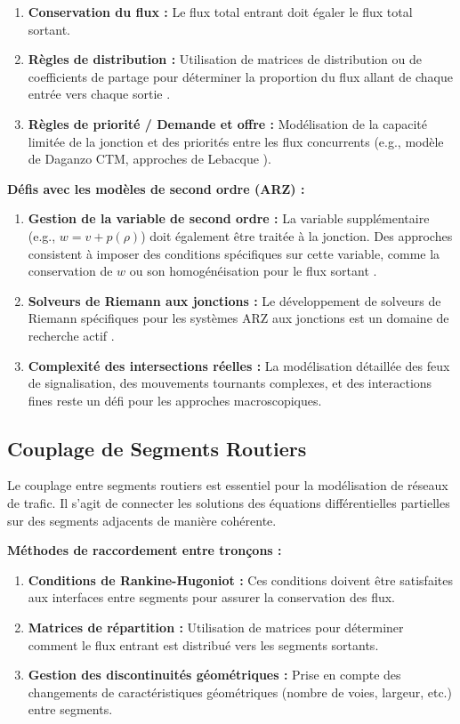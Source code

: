 \begin{enumerate}
    \item \textbf{Conservation du flux :} Le flux total entrant doit égaler le flux total sortant.
    \item \textbf{Règles de distribution :} Utilisation de matrices de distribution ou de coefficients de partage pour déterminer la proportion du flux allant de chaque entrée vers chaque sortie \cite{kolb2018pareto}.
    \item \textbf{Règles de priorité / Demande et offre :} Modélisation de la capacité limitée de la jonction et des priorités entre les flux concurrents (e.g., modèle de Daganzo CTM, approches de Lebacque \cite{Lebacque1996}).
\end{enumerate}

\textbf{Défis avec les modèles de second ordre (ARZ) :}

\begin{enumerate}
    \item \textbf{Gestion de la variable de second ordre :} La variable supplémentaire (e.g., $w = v + p(\rho)$) doit également être traitée à la jonction. Des approches consistent à imposer des conditions spécifiques sur cette variable, comme la conservation de $w$ ou son homogénéisation pour le flux sortant \cite{kolb2018pareto, HertyEtAl2007}.
    \item \textbf{Solveurs de Riemann aux jonctions :} Le développement de solveurs de Riemann spécifiques pour les systèmes ARZ aux jonctions est un domaine de recherche actif \cite{CostesequeSlides}.
    \item \textbf{Complexité des intersections réelles :} La modélisation détaillée des feux de signalisation, des mouvements tournants complexes, et des interactions fines reste un défi pour les approches macroscopiques.
\end{enumerate}

\subsection{Couplage de Segments Routiers}
Le couplage entre segments routiers est essentiel pour la modélisation de réseaux de trafic. Il s'agit de connecter les solutions des équations différentielles partielles sur des segments adjacents de manière cohérente.

\textbf{Méthodes de raccordement entre tronçons :}

\begin{enumerate}
    \item \textbf{Conditions de Rankine-Hugoniot :} Ces conditions doivent être satisfaites aux interfaces entre segments pour assurer la conservation des flux.
    \item \textbf{Matrices de répartition :} Utilisation de matrices pour déterminer comment le flux entrant est distribué vers les segments sortants.
    \item \textbf{Gestion des discontinuités géométriques :} Prise en compte des changements de caractéristiques géométriques (nombre de voies, largeur, etc.) entre segments.
\end{enumerate}

